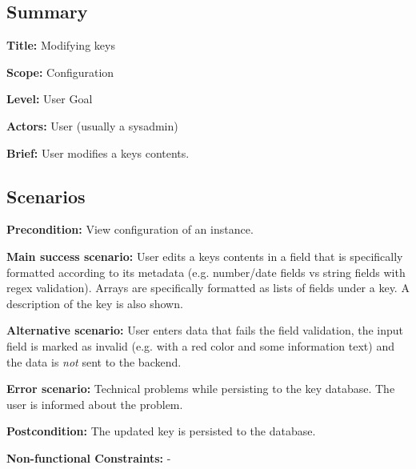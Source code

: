 \subsection*{Summary}


\begin{DoxyItemize}
\item {\bfseries Title\+:} Modifying keys
\item {\bfseries Scope\+:} Configuration
\item {\bfseries Level\+:} User Goal
\item {\bfseries Actors\+:} User (usually a sysadmin)
\item {\bfseries Brief\+:} User modifies a key\textquotesingle{}s contents.
\end{DoxyItemize}

\subsection*{Scenarios}


\begin{DoxyItemize}
\item {\bfseries Precondition\+:} View configuration of an instance.
\item {\bfseries Main success scenario\+:} User edits a key\textquotesingle{}s contents in a field that is specifically formatted according to its metadata (e.\+g. number/date fields vs string fields with regex validation). Arrays are specifically formatted as lists of fields under a key. A description of the key is also shown.
\item {\bfseries Alternative scenario\+:} User enters data that fails the field validation, the input field is marked as invalid (e.\+g. with a red color and some information text) and the data is {\itshape not} sent to the backend.
\item {\bfseries Error scenario\+:} Technical problems while persisting to the key database. The user is informed about the problem.
\item {\bfseries Postcondition\+:} The updated key is persisted to the database.
\item {\bfseries Non-\/functional Constraints\+:} -\/ 
\end{DoxyItemize}